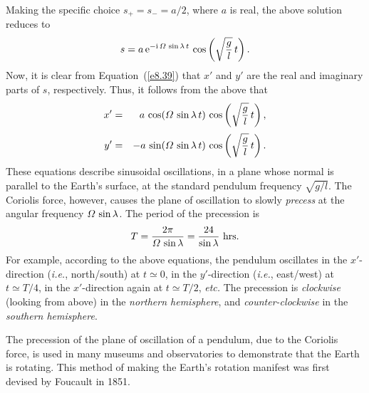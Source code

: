 Making the specific choice $s_+=s_-=a/2$, where $a$ is real, the
above solution reduces to
\begin{equation}
s = a\,{\rm e}^{-{\rm i}\,{\mit\Omega}\,\sin\lambda\,t} \,\cos\left(\sqrt{\frac{g}{l}}\,t\right).
\end{equation}
Now, it is clear from Equation~(\ref{e8.39}) that $x'$  and $y'$ are the real and imaginary
parts of $s$, respectively. Thus, it follows from the above that
\begin{eqnarray}
x'&=& a\,\cos({\mit\Omega}\,\sin\lambda\,t)\,\cos\left(\sqrt{\frac{g}{l}}\,t\right),\\[0.5ex]
y'&=& -a\,\sin({\mit\Omega}\,\sin\lambda\,t)\,\cos\left(\sqrt{\frac{g}{l}}\,t\right).
\end{eqnarray}
These  equations describe sinusoidal oscillations, in a plane whose normal
is parallel to the Earth's surface, at the standard pendulum frequency $\sqrt{g/l}$. 
The Coriolis force, however, causes the plane of oscillation to slowly {\em precess}\/ at the
angular frequency ${\mit\Omega}\,\sin\lambda$. The period of the
precession is 
\begin{equation}
T = \frac{2\pi}{{\mit\Omega}\,\sin\lambda} = \frac{24}{\sin\lambda}\,\,{\rm hrs}.
\end{equation}
For example, according to the above equations, the pendulum oscillates
in the $x'$-direction ({\em i.e.}, north/south) at $t\simeq 0$, in the $y'$-direction
({\em i.e.}, east/west) at $t\simeq T/4$, in the $x'$-direction again at $t\simeq T/2$, {\em etc.} The precession is {\em clockwise}\/ (looking from above)
in the {\em northern hemisphere}, and {\em counter-clockwise}\/
in the  {\em southern
hemisphere}. 

The precession of the plane of oscillation of a pendulum, due to
the Coriolis force, is used in many museums and observatories to
demonstrate that the Earth is rotating. This method of making the
Earth's rotation manifest was first devised by Foucault in 1851.

